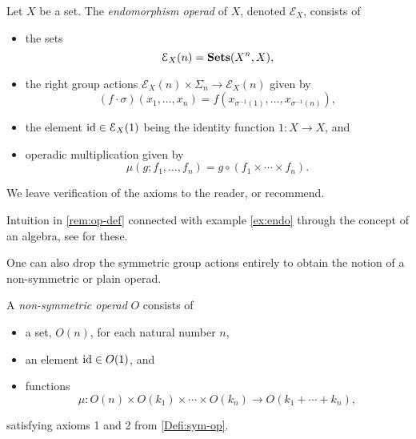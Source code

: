 \begin{example}\label{ex:endo}
Let $X$ be a set. The \emph{endomorphism operad} of $X$, denoted $\mathcal{E}_X$, consists of 
\begin{itemize}
\item the sets
\[
\mathcal{E}_X(n) = \mathbf{Sets}(X^n, X),
\]
\item the right group actions $\mathcal{E}_X(n) \times \Sigma_n \to \mathcal{E}_X(n)$ given by
\[
(f \cdot \sigma)(x_1, \ldots, x_n) = f( x_{\sigma^{-1}(1)}, \ldots, x_{\sigma^{-1}(n)}),
\]
\item the element $\textrm{id} \in \mathcal{E}_X(1)$ being the identity function $1 \colon X \to X$, and
\item operadic multiplication given by
\[
\mu(g; f_1, \ldots, f_n) = g \circ (f_1 \times \cdots \times f_n).
\]
\end{itemize}
We leave verification of the axioms to the reader, or recommend.
\end{example}

\begin{rem}
Intuition in \cref{rem:op-def} connected with example \cref{ex:endo} through the concept of an algebra, see for these.
\end{rem}

One can also drop the symmetric group actions entirely to obtain the notion of a non-symmetric or plain operad.

\begin{Defi}
A \emph{non-symmetric operad} $O$ consists of 
\begin{itemize}
\item a set, $O(n)$, for each natural number $n$,
\item an element $\textrm{id} \in O(1)$, and
\item functions
  \[
    \mu \colon  O(n) \times O(k_{1}) \times \cdots \times O(k_{n}) \rightarrow O(k_{1} + \cdots + k_{n}),
  \]
\end{itemize}
satisfying axioms 1 and 2 from \cref{Defi:sym-op}.
\end{Defi}

